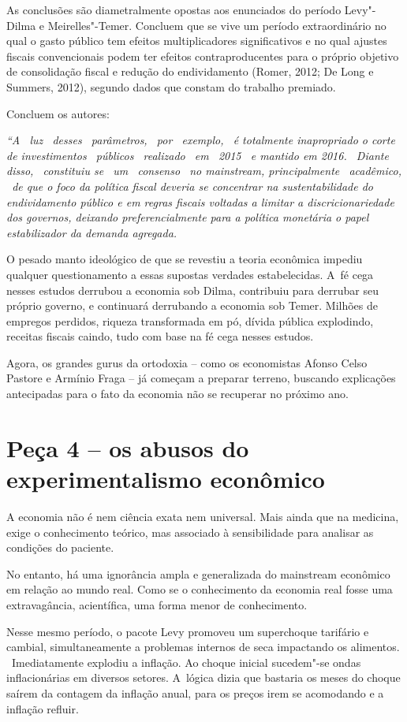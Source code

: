 As conclusões são diametralmente opostas aos enunciados do período
Levy"-Dilma e Meirelles"-Temer. Concluem que se vive um período
extraordinário no qual o gasto público tem efeitos multiplicadores
significativos e no qual ajustes fiscais convencionais podem ter efeitos
contraproducentes para o próprio objetivo de consolidação fiscal e
redução do endividamento (Romer, 2012; De Long e Summers, 2012), segundo
dados que constam do trabalho premiado.~

Concluem os autores:

\emph{``A~ luz~ desses~ parâmetros,~ por~ exemplo,~ é totalmente
inapropriado o corte de investimentos~ públicos~ realizado~ em~ 2015~ e
mantido em 2016.~ Diante~ disso,~ constituiu se~ um~ consenso~ no
mainstream, principalmente~ acadêmico, ~de que o foco da política fiscal
deveria se concentrar na sustentabilidade do endividamento público e em
regras fiscais voltadas a limitar a discricionariedade dos governos,
deixando preferencialmente para a política monetária o papel
estabilizador da demanda agregada.}

O pesado manto ideológico de que se revestiu a teoria econômica impediu
qualquer questionamento a essas supostas verdades estabelecidas. A~fé
cega nesses estudos derrubou a economia sob Dilma, contribuiu para
derrubar seu próprio governo, e continuará derrubando a economia sob
Temer. Milhões de empregos perdidos, riqueza transformada em pó, dívida
pública explodindo, receitas fiscais caindo, tudo com base na fé cega
nesses estudos.

Agora, os grandes gurus da ortodoxia -- como os economistas Afonso Celso
Pastore e Armínio Fraga -- já começam a preparar terreno, buscando
explicações antecipadas para o fato da economia não se recuperar no
próximo ano.

\section{Peça 4 -- os abusos do experimentalismo econômico}

A economia não é nem ciência exata nem universal. Mais ainda que na
medicina, exige o conhecimento teórico, mas associado à sensibilidade
para analisar as condições do paciente.

No entanto, há uma ignorância ampla e generalizada do mainstream
econômico em relação ao mundo real. Como se o conhecimento da economia
real fosse uma extravagância, acientífica, uma forma menor de
conhecimento.

Nesse mesmo período, o pacote Levy promoveu um superchoque tarifário e
cambial, simultaneamente a problemas internos de seca impactando os
alimentos. ~Imediatamente explodiu a inflação. Ao choque inicial
sucedem"-se ondas inflacionárias em diversos setores. A~lógica dizia que
bastaria os meses do choque saírem da contagem da inflação anual, para
os preços irem se acomodando e a inflação refluir.

